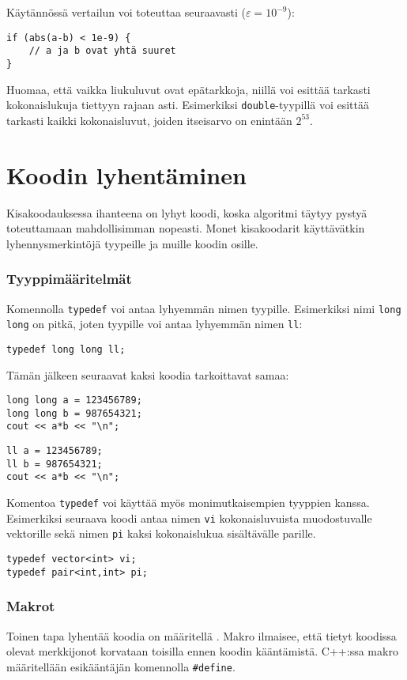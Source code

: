 Käytännössä vertailun voi toteuttaa seuraavasti ($\varepsilon=10^{-9}$):

\begin{lstlisting}
if (abs(a-b) < 1e-9) {
    // a ja b ovat yhtä suuret
}
\end{lstlisting}

Huomaa, että
vaikka liukuluvut ovat epätarkkoja, niillä voi esittää
tarkasti kokonaislukuja tiettyyn rajaan asti.
Esimerkiksi \texttt{double}-tyypillä voi esittää
tarkasti kaikki kokonaisluvut, joiden itseisarvo
on enintään $2^{53}$.

\section{Koodin lyhentäminen}

Kisakoodauksessa ihanteena on lyhyt koodi,
koska algoritmi täytyy pystyä toteuttamaan
mahdollisimman nopeasti.
Monet kisakoodarit käyttävätkin lyhennysmerkintöjä
tyypeille ja muille koodin osille.

\subsubsection{Tyyppimääritelmät}
Komennolla \texttt{typedef} voi antaa lyhyemmän
nimen tyypille.
Esimerkiksi nimi \texttt{long long} on pitkä,
joten tyypille voi antaa lyhyemmän nimen \texttt{ll}:
\begin{lstlisting}
typedef long long ll;
\end{lstlisting}
Tämän jälkeen seuraavat kaksi koodia tarkoittavat samaa:
\begin{lstlisting}
long long a = 123456789;
long long b = 987654321;
cout << a*b << "\n";
\end{lstlisting}
\begin{lstlisting}
ll a = 123456789;
ll b = 987654321;
cout << a*b << "\n";
\end{lstlisting}

Komentoa \texttt{typedef} voi käyttää myös
monimutkaisempien tyyppien kanssa.
Esimerkiksi seuraava koodi antaa nimen \texttt{vi}
kokonaisluvuista muodostuvalle vektorille
sekä nimen \texttt{pi} kaksi
kokonaislukua sisältävälle parille.
\begin{lstlisting}
typedef vector<int> vi;
typedef pair<int,int> pi;
\end{lstlisting}

\subsubsection{Makrot}
Toinen tapa lyhentää koodia on määritellä .
Makro ilmaisee, että tietyt koodissa olevat
merkkijonot korvataan toisilla ennen koodin
kääntämistä.
C++:ssa makro määritellään
esikääntäjän komennolla \texttt{\#define}.

